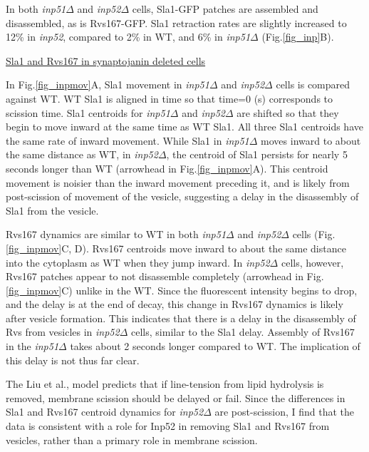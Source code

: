 	
In both \textit{inp51$\Delta$} and \textit{inp52$\Delta$} cells, Sla1-GFP patches are assembled and disassembled, as is Rvs167-GFP. Sla1 retraction rates are slightly increased to 12\% in \textit{inp52\textDelta}, compared to 2\% in WT, and 6\% in \textit{inp51$\Delta$}
(Fig.\ref{fig_inp}B). 
\vspace{5mm}

\underline{Sla1 and Rvs167 in synaptojanin deleted cells}

 In Fig.\ref{fig_inpmov}A, Sla1 movement in \textit{inp51$\Delta$} and \textit{inp52$\Delta$}
 cells is compared against WT. WT Sla1 is aligned in time so that time=0 (s) corresponds to scission time. Sla1 centroids for \textit{inp51$\Delta$} and \textit{inp52$\Delta$} are shifted so that they begin to move inward at the same time as WT Sla1. All three Sla1 centroids have the same rate of inward movement. While Sla1 in \textit{inp51$\Delta$} moves inward to about the same distance as WT, in \textit{inp52$\Delta$}, the centroid of Sla1 persists for nearly 5 seconds longer than WT (arrowhead in Fig.\ref{fig_inpmov}A). This centroid movement is noisier than the inward movement preceding it, and is likely from post-scission of movement of the vesicle, suggesting a delay in the disassembly of Sla1 from the vesicle. 


\vspace{5mm}	
Rvs167 dynamics are similar to WT in both \textit{inp51$\Delta$}
 and \textit{inp52$\Delta$} cells (Fig.\ref{fig_inpmov}C, D). Rvs167 centroids move inward to about the same distance into the cytoplasm as WT when they jump inward. In \textit{inp52$\Delta$} cells, however, Rvs167 patches appear to not disassemble completely (arrowhead in Fig.\ref{fig_inpmov}C) unlike in the WT. Since the fluorescent intensity begins to drop, and the delay is at the end of decay, this change in Rvs167 dynamics is likely after vesicle formation. This indicates that there is a delay in the disassembly of Rvs from vesicles in \textit{inp52$\Delta$} cells, similar to the Sla1 delay. Assembly of Rvs167 in the \textit{inp51$\Delta$}
 takes about 2 seconds longer compared to WT. The implication of this delay is not thus far clear. 

	\vspace{5mm}
The Liu et al., model predicts that if line-tension from lipid hydrolysis is removed, membrane scission should be delayed or fail. Since the differences in Sla1 and Rvs167 centroid dynamics for \textit{inp52$\Delta$} are post-scission, I find that the data is consistent with a role for Inp52 in removing Sla1 and Rvs167 from vesicles, rather than a primary role in membrane scission. 


